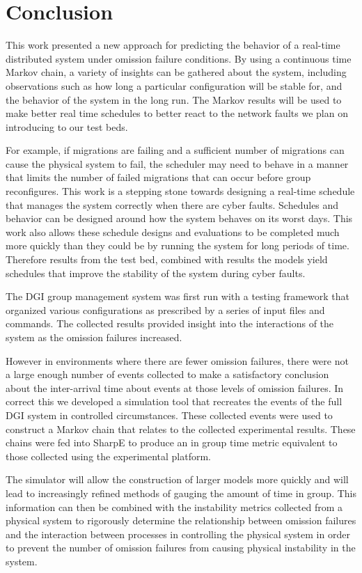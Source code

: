 \chapter{Conclusion}

This work presented a new approach for predicting the behavior of a real-time distributed system under omission failure conditions. By using a continuous time Markov chain, a variety of insights can be gathered about the system, including observations such as how long a particular configuration will be stable for, and the behavior of the system in the long run.  The Markov results will be used  to make better real time schedules to better react to the network faults we plan on introducing to our test beds. 

For example, if migrations are failing and a sufficient number of migrations can cause the physical system to fail, the scheduler may need to behave in a manner that limits the number of failed migrations that can occur before group reconfigures. This work is a stepping stone towards designing a real-time schedule that manages the system correctly when there are cyber faults. Schedules and behavior can be designed around how the system behaves on its worst days. This work also allows these schedule designs and evaluations to be completed much more quickly than they could be by running the system for long periods of time. Therefore results from the test bed, combined with results the models yield schedules that improve the stability of the system during cyber faults.

The DGI group management system was first run with a testing framework that organized various configurations as prescribed by a series of input files and commands. The collected results provided insight into the interactions of the system as the omission failures increased.

However in environments where there are fewer omission failures, there were not a large enough number of events collected to make a satisfactory conclusion about the inter-arrival time about events at those levels of omission failures. In correct this we developed a simulation tool that recreates the events of the full DGI system in controlled circumstances. These collected events were used to construct a Markov chain that relates to the collected experimental results. These chains were fed into SharpE to produce an in group time metric equivalent to those collected using the experimental platform.

The simulator will allow the construction of larger models more quickly and will lead to increasingly refined methods of gauging the amount of time in group. This information can then be combined with the instability metrics collected from a physical system to rigorously determine the relationship between omission failures and the interaction between processes in controlling the physical system in order to prevent the number of omission failures from causing physical instability in the system.

